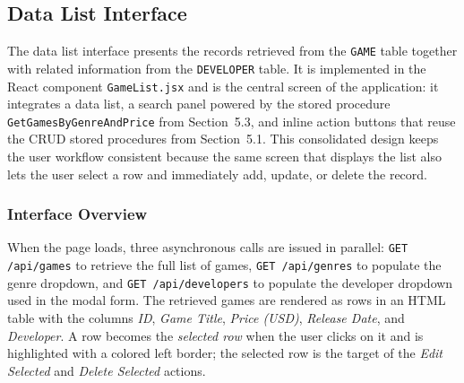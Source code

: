\subsection{Data List Interface}

The data list interface presents the records retrieved from the \texttt{GAME} table together with related information from the \texttt{DEVELOPER} table. It is implemented in the React component \texttt{GameList.jsx} and is the central screen of the application: it integrates a data list, a search panel powered by the stored procedure \texttt{GetGamesByGenreAndPrice} from Section~5.3, and inline action buttons that reuse the CRUD stored procedures from Section~5.1. This consolidated design keeps the user workflow consistent because the same screen that displays the list also lets the user select a row and immediately add, update, or delete the record.

\subsubsection{Interface Overview}

When the page loads, three asynchronous calls are issued in parallel: \texttt{GET /api/games} to retrieve the full list of games, \texttt{GET /api/genres} to populate the genre dropdown, and \texttt{GET /api/developers} to populate the developer dropdown used in the modal form. The retrieved games are rendered as rows in an HTML table with the columns \textit{ID}, \textit{Game Title}, \textit{Price (USD)}, \textit{Release Date}, and \textit{Developer}. A row becomes the \emph{selected row} when the user clicks on it and is highlighted with a colored left border; the selected row is the target of the \textit{Edit Selected} and \textit{Delete Selected} actions.

